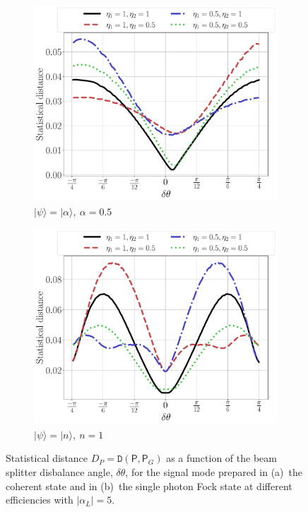 \documentclass[%
reprint,
superscriptaddress,
 amsmath,amssymb,amsfonts,
 aps,
 pra,
 longbibliography
]{revtex4-2}
\newcommand{\ket}[1]{\ensuremath{|{#1}\rangle}}
\newcommand{\prob}{\mathsf{P}}
\begin{document}
\begin{figure}
    \centering
    \begin{subfigure}[]{.45\textwidth}
\includegraphics[width=\linewidth]{pics/homodyne/full.pdf}
\caption[]{$\ket{\psi}=\ket{\alpha},\:\alpha=0.5$}
\label{fig:dth_alp}
        \end{subfigure}
        \begin{subfigure}[]{.45\textwidth}
 \includegraphics[width=\linewidth]{pics/homodyne/full_fock.pdf}
\caption[]{$\ket{\psi}=\ket{n},\:n=1$}
\label{fig:dth_fock}
\end{subfigure}
\caption{
  Statistical distance $D_P=\mathtt{D}(\prob,\prob_G)$
  as a function of the beam splitter disbalance angle, $\delta\theta$,
for the signal mode prepared in (a)~the coherent state and
  in (b)~the single photon Fock state at different efficiencies  with $|\alpha_L|=5$.
    }
    \label{fig:delta-theta}
\end{figure}
\end{document}
